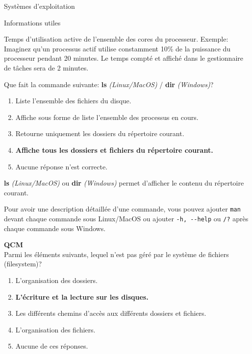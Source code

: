 \begin{section}{Systèmes d'exploitation}
\begin{Exercice}[5 minutes]
\begin{Example}{\faLightbulb \quad Informations utiles}
        \end{Example}
        \begin{solution}
            Temps d'utilisation active de l'ensemble des cores du processeur.
            Exemple: Imaginez qu'un processus actif utilise constamment 10\% de la puissance du processeur pendant 20 minutes. Le temps compté et affiché dans le gestionnaire de tâches sera de 2 minutes.
        \end{solution}
    \end{Exercice}
    \begin{Exercice}[5 minutes]
        Que fait la commande suivante: \textbf{ls} \textit{(Linux/MacOS)} / \textbf{dir} \textit{(Windows)}?
        \begin{enumerate}
            \item Liste l'ensemble des fichiers du disque.
            \item Affiche sous forme de liste l'ensemble des processus en cours.
            \item Retourne uniquement les dossiers du répertoire courant.
            \item \textbf{Affiche tous les dossiers et fichiers du répertoire courant.}
            \item Aucune réponse n'est correcte.
        \end{enumerate}
        \begin{solution}
            \textbf{ls} \textit{(Linux/MacOS)} ou \textbf{dir} \textit{(Windows)} permet d'afficher le contenu du répertoire courant.
        \end{solution}
        \begin{conseil}
            Pour avoir une description détaillée d'une commande, vous pouvez ajouter \lstinline{man} devant chaque commande sous Linux/MacOS ou ajouter \lstinline{-h, --help} ou \lstinline{/?} après chaque commande sous Windows.
        \end{conseil}
    \end{Exercice}
    
     \begin{Exercice}[5 minutes]  \textbf{QCM}\\
    Parmi les éléments suivants, lequel n'est pas géré par le système de fichiers (filesystem)?
        \begin{enumerate}
            \item L'organisation des dossiers.
            \item \textbf{L'écriture et la lecture sur les disques.}
            \item Les différents chemins d'accès aux différents dossiers et fichiers.
            \item L'organisation des fichiers.
            \item Aucune de ces réponses.
        \end{enumerate}
    \end{Exercice}
    

\end{section}
